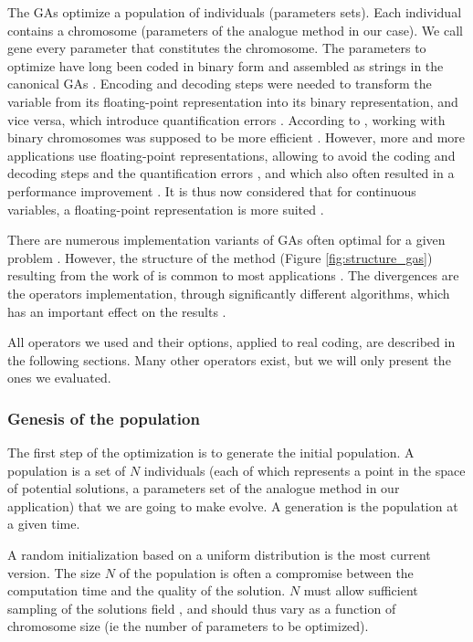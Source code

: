 \documentclass[twocol]{ametsoc}
\begin{document}
The GAs optimize a population of individuals (parameters sets). Each individual contains a chromosome (parameters of the analogue method in our case). We call gene every parameter that constitutes the chromosome. The parameters to optimize have long been coded in binary form and assembled as strings in the canonical GAs \citep{Goldberg1989}. Encoding and decoding steps were needed to transform the variable from its floating-point representation into its binary representation, and vice versa, which introduce quantification errors \citep{Haupt2004}. According to \citet{Holland1992b}, working with binary chromosomes was supposed to be more efficient \citep{Goldberg1990a, Back1993b}. However, more and more applications use floating-point representations, allowing to avoid the coding and decoding steps and the quantification errors \citep{Haupt2004}, and which also often resulted in a performance improvement \citep{Goldberg1990a}. It is thus now considered that for continuous variables, a floating-point representation is more suited \citep{Michalewicz1996, Herrera1998a, Haupt2004, Back1996b, Gaffney2010a}. 

There are numerous implementation variants of GAs often optimal for a given problem \citep{Hart1991a,Schraudolph1992a}. However, the structure of the method (Figure \ref{fig:structure_gas}) resulting from the work of \citet{Holland1992b} is common to most applications \citep{Back1993b}. The divergences are the operators implementation, through significantly different algorithms, which has an important effect on the results \citep{Gaffney2010a}.

All operators we used and their options, applied to real coding, are described in the following sections. Many other operators exist, but we will only present the ones we evaluated.


\subsubsection{Genesis of the population}

The first step of the optimization is to generate the initial population. A population is a set of $N$ individuals (each of which represents a point in the space of potential solutions, a parameters set of the analogue method in our application) that we are going to make evolve. A generation is the population at a given time. 

A random initialization based on a uniform distribution is the most current version. The size $N$ of the population is often a compromise between the computation time and the quality of the solution. $N$ must allow sufficient sampling of the solutions field \citep{Beasley1996a}, and should thus vary as a function of chromosome size (ie the number of parameters to be optimized). 
\end{document}
